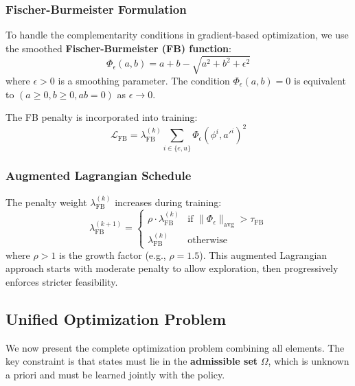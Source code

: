 \subsubsection{Fischer-Burmeister Formulation}
To handle the complementarity conditions in gradient-based optimization, we use the smoothed \textbf{Fischer-Burmeister (FB) function}:
\begin{equation}\label{eq:fb_function}
    \Phi_\epsilon(a, b) = a + b - \sqrt{a^2 + b^2 + \epsilon^2}
\end{equation}
where $\epsilon > 0$ is a smoothing parameter. The condition $\Phi_\epsilon(a, b) = 0$ is equivalent to $(a \geq 0, b \geq 0, ab = 0)$ as $\epsilon \to 0$.

The FB penalty is incorporated into training:
\begin{equation}\label{eq:fb_penalty}
    \mathcal{L}_{\text{FB}} = \lambda_{\text{FB}}^{(k)} \sum_{i \in \{e, u\}} \Phi_\epsilon(\phi^i, a'^i)^2
\end{equation}

\subsubsection{Augmented Lagrangian Schedule}
The penalty weight $\lambda_{\text{FB}}^{(k)}$ increases during training:
\begin{equation}
    \lambda_{\text{FB}}^{(k+1)} = \begin{cases}
        \rho \cdot \lambda_{\text{FB}}^{(k)} & \text{if } \|\Phi_\epsilon\|_{\text{avg}} > \tau_{\text{FB}} \\
        \lambda_{\text{FB}}^{(k)} & \text{otherwise}
    \end{cases}
\end{equation}
where $\rho > 1$ is the growth factor (e.g., $\rho = 1.5$). This augmented Lagrangian approach starts with moderate penalty to allow exploration, then progressively enforces stricter feasibility.


\subsection{Unified Optimization Problem}

We now present the complete optimization problem combining all elements. The key constraint is that states must lie in the \textbf{admissible set} $\Omega$, which is unknown a priori and must be learned jointly with the policy.

